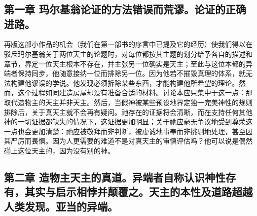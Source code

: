 

\section{}

\par


\subsection{第一章 玛尔基翁论证的方法错误而荒谬。论证的正确进路。}

再版这部小作品的机会（我们在第一部书的序言中已提及它的经历）使我们得以在驳斥玛尔基翁关于两位天主的论题时，对每位都按其主题的划分给予各自的描述和章节，界定一位天主根本不存在，并主张另一位确实是天主；至此与这位本都的异端者保持同步，他随意接纳一位而排除另一位。因为他若不摧毁真理的体系，就无法构建他谬误的学说。他发现必须拆除某些东西，才能构建他所希望的理论。然而，这个过程如同建造房屋却没有准备合适的材料。讨论本应只集中于这一点：那取代造物主的天主并非天主。然后，当假神被某些预设地界定独一完美神性的规则排除后，关于真天主就不会再有疑问。祂存在的证据将会清晰，而在支持任何其他神的一切证据都缺失的情况下，这证据更加明显；关于祂应毫无争议地受到尊荣这一点也会更加清楚：祂应被敬拜而非判断，被虔诚地事奉而非挑剔地处理，甚至因其严厉而畏惧。因为人更需要的难道不是对真天主的审慎评估吗？他可以说是偶然碰上这位天主的，因为没有别的神。\par


\subsection{第二章 造物主天主的真道。异端者自称认识神性存有，其实与启示相悖并颠覆之。天主的本性及道路超越人类发现。亚当的异端。}

